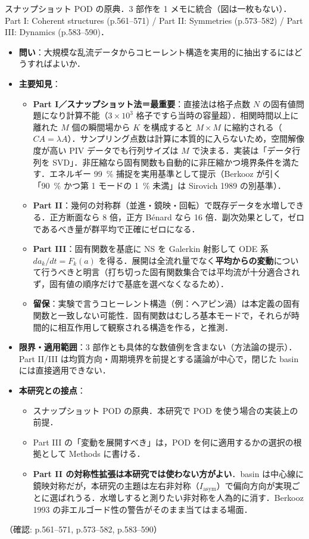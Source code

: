 \documentclass[11pt]{jsarticle}
\newcommand{\litref}[1]{{\large\bfseries\color{citecolor}#1}}
\begin{document}
\noindent\litref{Sirovich (1987, I--III)}\quad スナップショット POD の原典．3 部作を 1 メモに統合（図は一枚もない）．Part I: Coherent structures (p.561--571) / Part II: Symmetries (p.573--582) / Part III: Dynamics (p.583--590)．
\begin{itemize}
  \item \textbf{問い}：大規模な乱流データからコヒーレント構造を実用的に抽出するにはどうすればよいか．
  \item \textbf{主要知見}：
  \begin{itemize}
    \item \textbf{Part I／スナップショット法＝最重要}：直接法は格子点数 $N$ の固有値問題になり計算不能（$3 \times 10^3$ 格子ですら当時の容量超）．相関時間以上に離れた $M$ 個の瞬間場から $K$ を構成すると $M \times M$ に縮約される（$CA = \lambda A$）．サンプリング点数は計算に本質的に入らないため，空間解像度が高い PIV データでも行列サイズは $M$ で決まる．実装は「データ行列を SVD」．非圧縮なら固有関数も自動的に非圧縮かつ境界条件を満たす．エネルギー 99~\% 捕捉を実用基準として提示（Berkooz が引く「90~\% かつ第 1 モードの 1~\% 未満」は Sirovich 1989 の別基準）．
    \item \textbf{Part II}：幾何の対称群（並進・鏡映・回転）で既存データを水増しできる．正方断面なら 8 倍，正方 B\'enard なら 16 倍．副次効果として，ゼロであるべき量が群平均で正確にゼロになる．
    \item \textbf{Part III}：固有関数を基底に NS を Galerkin 射影して ODE 系 $da_k/dt = F_k(a)$ を得る．展開は全流れ量でなく\textbf{平均からの変動}について行うべきと明言（打ち切った固有関数集合では平均流が十分適合されず，固有値の順序だけで基底を選べなくなるため）．
    \item \textbf{留保}：実験で言うコヒーレント構造（例：ヘアピン渦）は本定義の固有関数と一致しない可能性．固有関数はむしろ基本モードで，それらが時間的に相互作用して観察される構造を作る，と推測．
  \end{itemize}
  \item \textbf{限界・適用範囲}：3 部作とも具体的な数値例を含まない（方法論の提示）．Part II/III は均質方向・周期境界を前提とする議論が中心で，閉じた basin には直接適用できない．
  \item \textbf{本研究との接点}：
  \begin{itemize}
    \item スナップショット POD の原典．本研究で POD を使う場合の実装上の前提．
    \item Part III の「変動を展開すべき」は，POD を何に適用するかの選択の根拠として Methods に書ける．
    \item \textbf{Part II の対称性拡張は本研究では使わない方がよい}．basin は中心線に鏡映対称だが，本研究の主題は左右非対称（$I_\mathrm{asym}$）で偏向方向が実現ごとに選ばれうる．水増しすると測りたい非対称を人為的に消す．Berkooz 1993 の非エルゴード性の警告がそのまま当てはまる場面．
  \end{itemize}
\end{itemize}
\noindent（確認: p.561--571, p.573--582, p.583--590）
\end{document}
